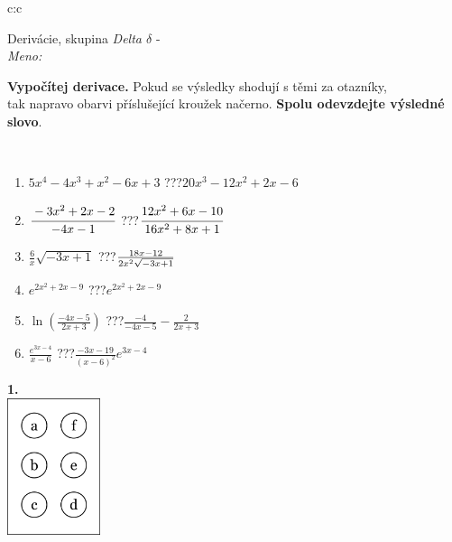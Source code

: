 \documentclass[10pt]{report}
\begin{document}
\begin{tabular}{c:c}
\begin{minipage}[c][104.5mm][t]{0.5\linewidth}
\begin{center}
\vspace{7mm}
{\huge Derivácie, skupina \textit{Delta $\delta$} -}\\[5mm]
\textit{Meno:}\phantom{xxxxxxxxxxxxxxxxxxxxxxxxxxxxxxxxxxxxxxxxxxxxxxxxxxxxxxxxxxxxxxxxx}\\[5mm]
\begin{minipage}{0.95\linewidth}
\begin{center}
\textbf{Vypočítej derivace.} Pokud se výsledky shodují s těmi za otazníky,\\tak napravo obarvi příslušející kroužek načerno. \textbf{Spolu odevzdejte výsledné slovo}.
\end{center}
\end{minipage}
\\[1mm]
\begin{minipage}{0.79\linewidth}
\begin{center}
\begin{varwidth}{\linewidth}
\begin{enumerate}
\normalsize
\item $5x^4-4x^3+x^2-6x+3$\quad \dotfill\; ???\;\dotfill \quad $20x^3-12x^2+2x-6$
\item $\cfrac{-3x^2+2x-2}{-4x-1}$\quad \dotfill\; ???\;\dotfill \quad $\cfrac{12x^2+6x-10}{16x^2+8x+1}$
\item $\frac{6}{x}\sqrt{-3x+1}$\quad \dotfill\; ???\;\dotfill \quad $\frac{18x-12}{2x^2 \sqrt{\smash[b]{-3x+1}}}$
\item $e^{2x^2+2x-9}$\quad \dotfill\; ???\;\dotfill \quad $e^{2x^2+2x-9}$
\item $\ln{\left(\frac{-4x-5}{2x+3}\right)}$\quad \dotfill\; ???\;\dotfill \quad $\frac{-4}{-4x-5}-\frac{2}{2x+3}$
\item $\frac{e^{3x-4}}{x-6}$\quad \dotfill\; ???\;\dotfill \quad $\frac{-3x-19}{(x-6)^2}e^{3x-4}$
\end{enumerate}
\end{varwidth}
\end{center}
\end{minipage}
\begin{minipage}{0.20\linewidth}
\begin{center}
{\Huge\bfseries 1.} \\[2mm]
\includegraphics[height=40mm]{../images/braille.png}

\end{center}
\end{minipage}
\end{center}
\end{minipage}
\end{tabular}
\end{document}
